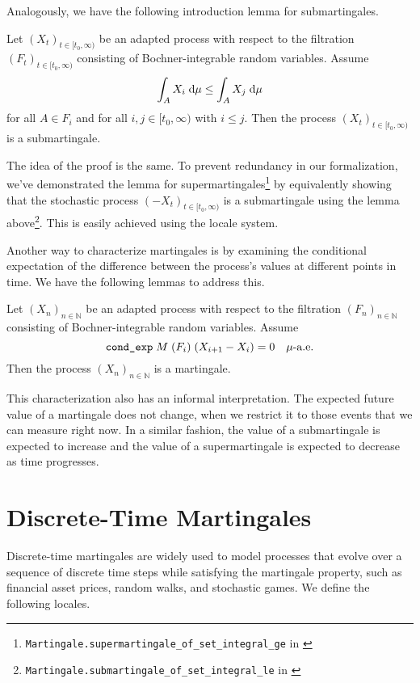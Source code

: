 Analogously, we have the following introduction lemma for submartingales.

\begin{lemma}
	Let $(X_t)_{t \in [t_0,\infty)}$ be an adapted process with respect to the filtration $(F_t)_{t \in [t_0,\infty)}$ consisting of Bochner-integrable random variables.
  Assume 
  \[
  \normalfont \int_A X_i \;\textrm{d}\mu \le \int_A X_j \;\textrm{d}\mu
  \] 
  for all $A \in F_i$ and for all $i,j \in [t_0,\infty)$ with $i \le j$. Then the process $(X_t)_{t \in [t_0,\infty)}$ is a submartingale.
\end{lemma}

The idea of the proof is the same. To prevent redundancy in our formalization, we've demonstrated the lemma for supermartingales\footnote{\texttt{Martingale.supermartingale\_of\_set\_integral\_ge} in \cite{Keskin_A_Formalization_of_2023}} by equivalently showing that the stochastic process $(-X_t)_{t \in [t_0,\infty)}$ is a submartingale using the lemma above\footnote{\texttt{Martingale.submartingale\_of\_set\_integral\_le} in \cite{Keskin_A_Formalization_of_2023}}. This is easily achieved using the locale system.

Another way to characterize martingales is by examining the conditional expectation of the difference between the process's values at different points in time. We have the following lemmas to address this.

\begin{lemma}
  Let $(X_n)_{n \in \mathbb{N}}$ be an adapted process with respect to the filtration $(F_n)_{n \in \mathbb{N}}$ consisting of Bochner-integrable random variables. Assume 
  \[
  \normalfont \texttt{cond\_exp} \; M \; (F_i) \; (X_{i+1} - X_i) = 0 \quad\mu\textrm{-a.e.}
  \] 
  Then the process $(X_n)_{n \in \mathbb{N}}$ is a martingale.
\end{lemma}

This characterization also has an informal interpretation. The expected future value of a martingale does not change, when we restrict it to those events that we can measure right now. In a similar fashion, the value of a submartingale is expected to increase and the value of a supermartingale is expected to decrease as time progresses.

\section{Discrete-Time Martingales}

Discrete-time martingales are widely used to model processes that evolve over a sequence of discrete time steps while satisfying the martingale property, such as financial asset prices, random walks, and stochastic games. We define the following locales.

